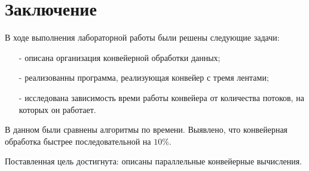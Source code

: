 \chapter*{Заключение}

В ходе выполнения лабораторной работы были решены следующие задачи:
\begin{itemize}
	\item[-] описана организация конвейерной обработки данных;
	\item[-] реализованны программа, реализующая конвейер с тремя лентами;
	\item[-] исследована зависимость времи работы конвейера от количества потоков, на которых он работает.
\end{itemize}

В данном были сравнены алгоритмы по времени. Выявлено, что конвейерная обработка быстрее последовательной на $10\%$.

Поставленная цель достигнута: описаны параллельные конвейерные вычисления.